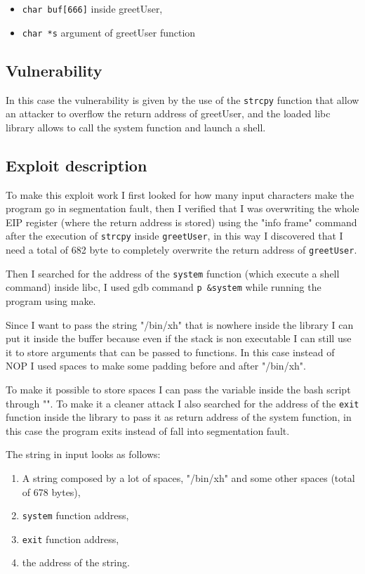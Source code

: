 \documentclass[a4paper,12pt]{article}
\begin{document}
\begin{itemize}
\item \texttt{char buf[666]} inside greetUser,
\item \texttt{char *s} argument of greetUser function
\end{itemize}

\subsection{Vulnerability}

In this case the vulnerability is given by the use of the \texttt{strcpy} function that allow an attacker to overflow the return address of greetUser, and the loaded libc library allows to call the system function and launch a shell.

\subsection{Exploit description} 

To make this exploit work I first looked for how many input characters make the program go in segmentation fault, then I verified that I was overwriting the whole EIP register (where the return address is stored) using the "info frame" command after the execution of \texttt{strcpy} inside \texttt{greetUser}, in this way I discovered that I need a total of 682 byte to completely overwrite the return address of \texttt{greetUser}.

Then I searched for the address of the \texttt{system} function (which execute a shell command) inside libc, I used gdb command \texttt{p \&system} while running the program using make.

Since I want to pass the string "/bin/xh" that is nowhere inside the library I can put it inside the buffer because even if the stack is non executable I can still use it to store arguments that can be passed to functions. In this case instead of NOP I used spaces to make some padding before and after "/bin/xh".

To make it possible to store spaces I can pass the variable inside the bash script through "". To make it a cleaner attack I also searched for the address of the \texttt{exit} function inside the library to pass it as return address of the system function, in this case the program exits instead of fall into segmentation fault.

The string in input looks as follows:
\begin{enumerate}
\item A string composed by a lot of spaces, "/bin/xh" and some other spaces (total of 678 bytes),
\item \texttt{system} function address,
\item \texttt{exit} function address,
\item the address of the string.
\end{enumerate}
\end{document}
